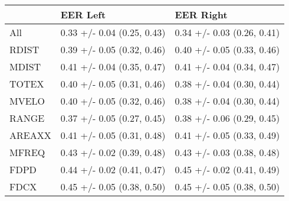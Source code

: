 \begin{tabular}{lll}
\toprule
{} &                    EER Left &                   EER Right \\
\midrule
All    &  0.33 +/- 0.04 (0.25, 0.43) &  0.34 +/- 0.03 (0.26, 0.41) \\
RDIST  &  0.39 +/- 0.05 (0.32, 0.46) &  0.40 +/- 0.05 (0.33, 0.46) \\
MDIST  &  0.41 +/- 0.04 (0.35, 0.47) &  0.41 +/- 0.04 (0.34, 0.47) \\
TOTEX  &  0.40 +/- 0.05 (0.31, 0.46) &  0.38 +/- 0.04 (0.30, 0.44) \\
MVELO  &  0.40 +/- 0.05 (0.32, 0.46) &  0.38 +/- 0.04 (0.30, 0.44) \\
RANGE  &  0.37 +/- 0.05 (0.27, 0.45) &  0.38 +/- 0.06 (0.29, 0.45) \\
AREAXX &  0.41 +/- 0.05 (0.31, 0.48) &  0.41 +/- 0.05 (0.33, 0.49) \\
MFREQ  &  0.43 +/- 0.02 (0.39, 0.48) &  0.43 +/- 0.03 (0.38, 0.48) \\
FDPD   &  0.44 +/- 0.02 (0.41, 0.47) &  0.45 +/- 0.02 (0.41, 0.49) \\
FDCX   &  0.45 +/- 0.05 (0.38, 0.50) &  0.45 +/- 0.05 (0.38, 0.50) \\
\bottomrule
\end{tabular}
